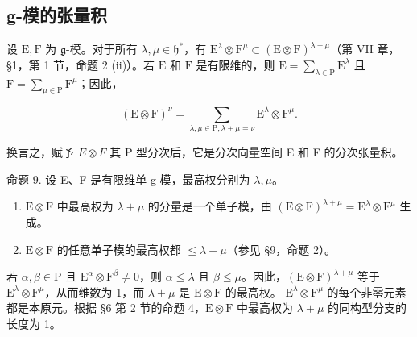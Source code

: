 \subsection{g-模的张量积}

设 \(\mathrm{E},\mathrm{F}\) 为 \(\mathfrak{g}\)-模。对于所有 \(\lambda, \mu \in \mathfrak{h}^*\)，有 \(\mathrm{E}^\lambda \otimes \mathrm{F}^\mu \subset (\mathrm{E} \otimes \mathrm{F})^{\lambda + \mu}\)（第 VII 章，§1，第 1 节，命题 2 (ii)）。若 \(\mathrm{E}\) 和 \(\mathrm{F}\) 是有限维的，则 \(\mathrm{E} = \sum_{\lambda \in \mathrm{P}} \mathrm{E}^\lambda\) 且 \(\mathrm{F} = \sum_{\mu \in \mathrm{P}} \mathrm{F}^\mu\)；因此，

\[
(\mathrm{E} \otimes \mathrm{F}) ^ {\nu} = \sum_ {\lambda , \mu \in \mathrm{P}, \lambda + \mu = \nu} \mathrm{E} ^ {\lambda} \otimes \mathrm{F} ^ {\mu}.
\]

换言之，赋予 \(E \otimes F\) 其 P 型分次后，它是分次向量空间 E 和 F 的分次张量积。

命题 9. 设 E、F 是有限维单 g-模，最高权分别为 \(\lambda,\mu\)。

\begin{enumerate}
\def\labelenumi{(\roman{enumi})}
\item
  \(\mathrm{E} \otimes \mathrm{F}\) 中最高权为 \(\lambda + \mu\) 的分量是一个单子模，由 \((\mathrm{E} \otimes \mathrm{F})^{\lambda + \mu} = \mathrm{E}^{\lambda} \otimes \mathrm{F}^{\mu}\) 生成。
\item
  \(\mathrm{E} \otimes \mathrm{F}\) 的任意单子模的最高权都 \(\leq \lambda + \mu\)（参见 §9，命题 2）。
\end{enumerate}

若 \(\alpha, \beta \in \mathrm{P}\) 且 \(\mathrm{E}^{\alpha} \otimes \mathrm{F}^{\beta} \neq 0\)，则 \(\alpha \leq \lambda\) 且 \(\beta \leq \mu\)。因此，\((\mathrm{E} \otimes \mathrm{F})^{\lambda + \mu}\) 等于 \(\mathrm{E}^{\lambda} \otimes \mathrm{F}^{\mu}\)，从而维数为 1，而 \(\lambda + \mu\) 是 \(\mathrm{E} \otimes \mathrm{F}\) 的最高权。 \(\mathrm{E}^{\lambda} \otimes \mathrm{F}^{\mu}\) 的每个非零元素都是本原元。根据 §6 第 2 节的命题 4，\(\mathrm{E} \otimes \mathrm{F}\) 中最高权为 \(\lambda + \mu\) 的同构型分支的长度为 1。


